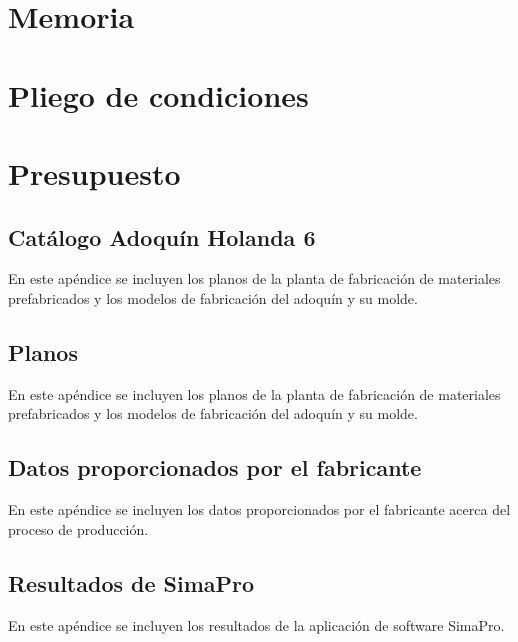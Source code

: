 \documentclass[12pt,titlepage,openright]{report}
\begin{document}
\renewcommand\listtablename{Índice de tablas}
\renewcommand\tablename{Tabla}



 \tableofcontents \newpage \listoffigures
\newpage \listoftables \newpage {}


\cleardoublepage

\part{Memoria}








\cleardoublepage

\part{Pliego de condiciones}

\cleardoublepage

\part{Presupuesto}

\cleardoublepage

\appendix
\chapter{Catálogo Adoquín Holanda 6}\label{apend:catalogo}
En este apéndice se incluyen los planos de la planta de fabricación de materiales prefabricados y los modelos de fabricación del adoquín y su molde.
\cleardoublepage

\chapter{Planos}\label{apend:planos}
En este apéndice se incluyen los planos de la planta de fabricación de materiales prefabricados y los modelos de fabricación del adoquín y su molde.
\cleardoublepage

\chapter{Datos proporcionados por el fabricante}\label{apend:datos}
En este apéndice se incluyen los datos proporcionados por el fabricante acerca del proceso de producción.
\cleardoublepage

\chapter{Resultados de SimaPro}\label{apend:simapro}
En este apéndice se incluyen los resultados de la aplicación de software SimaPro.
\cleardoublepage



\end{document}
